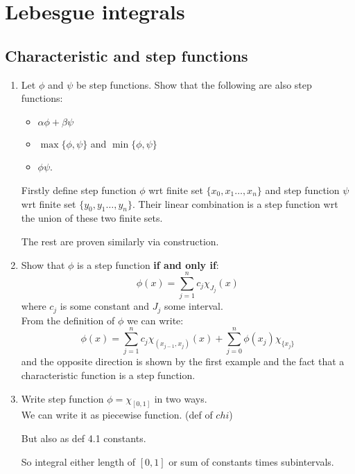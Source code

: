 \section{Lebesgue integrals}

\subsection{Characteristic and step functions}
\begin{enumerate}
    \item Let $\phi$ and $\psi$ be step functions. Show that the following are also step functions:
    \begin{itemize}
        \item $\alpha\phi+\beta\psi$
        \item $\max\{\phi,\psi\}$ and $\min\{\phi,\psi\}$
        \item $\phi\psi$. \\
    \end{itemize}

    Firstly define step function $\phi$ wrt finite set $\{x_0,x_1\dots,x_n\}$
    and step function $\psi$ wrt finite set $\{y_0,y_1\dots,y_n\}$.
    Their linear combination is a step function wrt the union of these two finite sets.

    The rest are proven similarly via construction.

    \item Show that $\phi$ is a step function \textbf{if and only if}:
    $$\phi(x)=\sum_{j=1}^{n}c_j\chi_{J_j}(x)$$
    where $c_j$ is some constant and $J_j$ some interval. \\

    From the definition of $\phi$ we can write:
    $$\phi(x)=\sum_{j=1}^{n}c_j\chi_{(x_{j-1},x_j)}(x)
    +\sum_{j=0}^{n}\phi(x_j)\chi_{\{x_j\}}$$
    and the opposite direction is shown by the first example
    and the fact that a characteristic function is a step function. \\

    \item Write step function $\phi=\chi_{[0,1]}$
    in two ways. \\

    We can write it as piecewise function. (def of $chi$)

    But also as def 4.1 constants.

    So integral either length of $[0,1]$
    or sum of constants times subintervals.

    \newpage


\end{enumerate}
